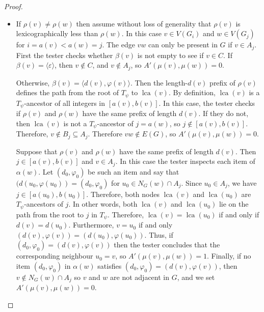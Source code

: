\documentclass{patmorin}
\renewcommand{\ge}{\geqslant}
\DeclareMathOperator{\lca}{lca}
\begin{document}
\begin{proof}
\begin{itemize}
       \item If $\rho(v)\neq\rho(w)$ then assume without loss of generality that $\rho(v)$ is lexicographically less than $\rho(w)$.
       In this case $v\in V(G_i)$ and $w\in V(G_j)$ for $i=a(v)<a(w)=j$.
       The edge $vw$ can only be present in $G$ if $v\in A_j$.
       First the tester checks whether $\beta(v)$ is not empty to see if $v\in C$.
       If $\beta(v)=\langle\varepsilon\rangle$, then
       $v\not\in C$, and  $v\not\in A_j$, so $A'(\mu(v),\mu(w))=0$.

       Otherwise, $\beta(v)=\langle d(v),\varphi(v)\rangle$.  Then the length-$d(v)$ prefix of $\rho(v)$ defines the path from the root of $T_\psi$ to $\lca(v)$.  By definition, $\lca(v)$ is a $T_\psi$-ancestor of all integers in $[a(v),b(v)]$. In this case, the tester checks if $\rho(v)$ and $\rho(w)$ have the same prefix of length $d(v)$.  If they do not, then $\lca(v)$ is not a $T_\psi$-ancestor of $j=a(w)$, so $j\not\in[a(v),b(v)]$.  Therefore, $v\not\in B_{j}\subseteq A_j$.
       Therefore $vw\not\in E(G)$, so $A'(\mu(v),\mu(w))=0$.

       Suppose that $\rho(v)$ and $\rho(w)$ have the same prefix of length $d(v)$.  Then $j\in [a(v),b(v)]$ and $v\in A_j$.
       In this case the tester inspects each item of $\alpha(w)$. Let $(d_0,\varphi_0)$ be such an item and say that $(d(u_0,\varphi(u_0))=(d_0,\varphi_0)$ for $u_0 \in N_G(w)\cap A_j$.
       Since $u_0 \in A_j$, we have $j\in[a(u_0),b(u_0)]$.
       Therefore, both nodes $\lca(v)$ and $\lca(u_0)$ are $T_\psi$-ancestors of $j$. In other words, both $\lca(v)$ and $\lca(u_0)$ lie on the path from the root to $j$ in $T_{\psi}$.
       Therefore, $\lca(v)=\lca(u_0)$ if and only if $d(v)=d(u_0)$. Furthermore, $v=u_0$ if and only $(d(v),\varphi(v))=(d(u_0),\varphi(u_0))$. Thus, if $(d_0,\varphi_0)=(d(v),\varphi(v))$ then the tester concludes that the corresponding neighbour $u_0=v$, so $A'(\mu(v),\mu(w))=1$.
       Finally, if no item $(d_0,\varphi_0)$ in $\alpha(w)$ satisfies $(d_0,\varphi_0)=(d(v),\varphi(v))$, then $v\not\in N_G(w)\cap A_j$ so $v$ and $w$ are not adjacent in $G$, and we set $A'(\mu(v),\mu(w))=0$.
     \end{itemize}




\end{proof}
\end{document}
